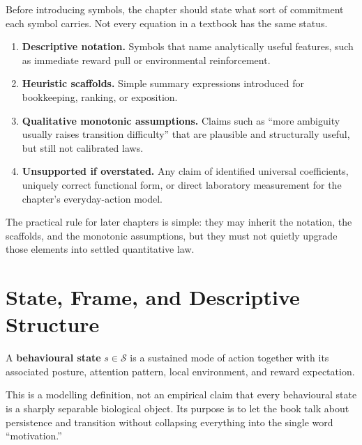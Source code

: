 Before introducing symbols, the chapter should state what sort of commitment
each symbol carries. Not every equation in a textbook has the same status.

\begin{enumerate}[nosep]
  \item \textbf{Descriptive notation.} Symbols that name analytically useful
        features, such as immediate reward pull or environmental reinforcement.
  \item \textbf{Heuristic scaffolds.} Simple summary expressions introduced for
        bookkeeping, ranking, or exposition.
  \item \textbf{Qualitative monotonic assumptions.} Claims such as ``more
        ambiguity usually raises transition difficulty'' that are plausible and
        structurally useful, but still not calibrated laws.
  \item \textbf{Unsupported if overstated.} Any claim of identified universal
        coefficients, uniquely correct functional form, or direct laboratory
        measurement for the chapter's everyday-action model.
\end{enumerate}

\begin{remark}
The practical rule for later chapters is simple: they may inherit the
notation, the scaffolds, and the monotonic assumptions, but they must not
quietly upgrade those elements into settled quantitative law.
\end{remark}

\section{State, Frame, and Descriptive Structure}

\begin{definition}
A \textbf{behavioural state} $s \in \mathcal{S}$ is a sustained mode of action
together with its associated posture, attention pattern, local environment, and
reward expectation.
\end{definition}

\begin{remark}
This is a modelling definition, not an empirical claim that every behavioural
state is a sharply separable biological object. Its purpose is to let the book
talk about persistence and transition without collapsing everything into the
single word ``motivation.''
\end{remark}


